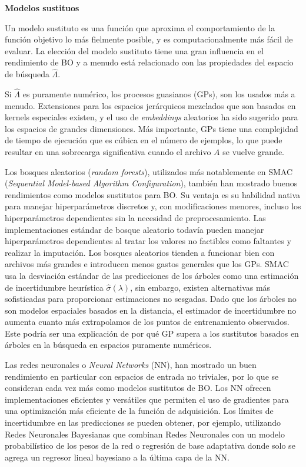 \quad

\textbf{Modelos sustituos}

\quad

Un modelo sustituto es una función que aproxima el comportamiento de la función objetivo lo más fielmente posible, y es computacionalmente más fácil de evaluar. La elección del modelo sustituto tiene una gran influencia en el rendimiento de BO y a menudo está relacionado con las propiedades del espacio de búsqueda $\hat{\varLambda}$. 

Si $\hat{\varLambda}$ es puramente numérico, los procesos guasianos (GPs), son los usados más a menudo. Extensiones para los espacios jerárquicos mezclados que son basados en kernels especiales existen, y el uso de \emph{embeddings} aleatorios ha sido sugerido para los espacios de grandes dimensiones. Más importante, GPs tiene una complejidad de tiempo de ejecución que es cúbica en el número de ejemplos, lo que puede resultar en una sobrecarga significativa cuando el archivo $A$ se vuelve grande.

Los bosques aleatorios (\emph{random forests}), utilizados más notablemente en SMAC (\emph{Sequential Model-based Algorithm Configuration}), también han mostrado buenos rendimientos como modelos sustitutos para BO. Su ventaja es su habilidad nativa para manejar hiperparámetros discretos y, con modificaciones menores, incluso los hiperparámetros dependientes sin la necesidad de preprocesamiento. Las implementaciones estándar de bosque aleatorio todavía pueden manejar hiperparámetros dependientes al tratar los valores no factibles como faltantes y realizar la imputación. Los bosques aleatorios tienden a funcionar bien con archivos más grandes e introducen menos gastos generales que los GPs. SMAC usa la desviación estándar de las predicciones de los árboles como una estimación de incertidumbre heurística $\hat{\sigma}(\lambda)$,  sin embargo, existen alternativas más sofisticadas para proporcionar estimaciones no sesgadas. Dado que los árboles no son modelos espaciales basados en la distancia, el estimador de incertidumbre no aumenta cuanto más extrapolamos de los puntos de entrenamiento observados. Este podría ser una explicación de por qué GP supera a los sustitutos basados en árboles en la búsqueda en espacios puramente numéricos.

Las redes neuronales o \emph{Neural Networks} (NN), han mostrado un buen rendimiento en particular con espacios de entrada no triviales, por lo que se consideran cada vez más como modelos sustitutos de BO. Los NN ofrecen implementaciones eficientes y versátiles que permiten el uso de gradientes para una optimización más eficiente de la función de adquisición. Los límites de incertidumbre en las predicciones se pueden obtener, por ejemplo, utilizando Redes Neuronales Bayesianas que combinan Redes Neuronales con un modelo probabilístico de los pesos de la red o regresión de base adaptativa donde solo se agrega un regresor lineal bayesiano a la última capa de la NN.


